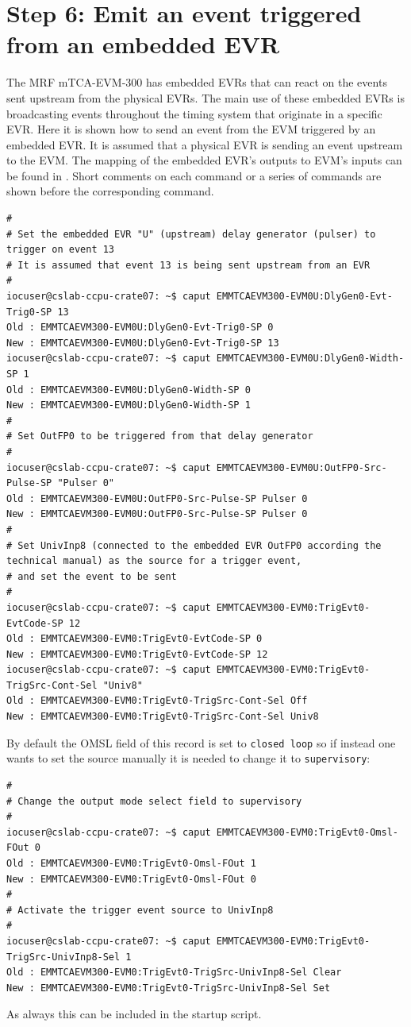 \documentclass[11pt
  , a4paper
  , article
  , oneside
  , showtrims
]{memoir}
\begin{document}
\section{Step 6: Emit an event triggered from an embedded EVR}
The MRF mTCA-EVM-300 has embedded EVRs that can react on the events sent upstream from the physical EVRs. The main use of these embedded EVRs is broadcasting events throughout the timing system that originate in a specific EVR. Here it is shown how to send an event from the EVM triggered by an embedded EVR. It is assumed that a physical EVR is sending an event upstream to the EVM. The mapping of the embedded EVR's outputs to EVM's inputs can be found in \cite{MRFEVENTGENERATOR}. Short comments on each command or a series of commands are shown before the corresponding command.
\begin{lstlisting}[style=termstyle]
#
# Set the embedded EVR "U" (upstream) delay generator (pulser) to trigger on event 13
# It is assumed that event 13 is being sent upstream from an EVR
#
iocuser@cslab-ccpu-crate07: ~$ caput EMMTCAEVM300-EVM0U:DlyGen0-Evt-Trig0-SP 13
Old : EMMTCAEVM300-EVM0U:DlyGen0-Evt-Trig0-SP 0
New : EMMTCAEVM300-EVM0U:DlyGen0-Evt-Trig0-SP 13
iocuser@cslab-ccpu-crate07: ~$ caput EMMTCAEVM300-EVM0U:DlyGen0-Width-SP 1
Old : EMMTCAEVM300-EVM0U:DlyGen0-Width-SP 0
New : EMMTCAEVM300-EVM0U:DlyGen0-Width-SP 1
#
# Set OutFP0 to be triggered from that delay generator
#
iocuser@cslab-ccpu-crate07: ~$ caput EMMTCAEVM300-EVM0U:OutFP0-Src-Pulse-SP "Pulser 0"
Old : EMMTCAEVM300-EVM0U:OutFP0-Src-Pulse-SP Pulser 0
New : EMMTCAEVM300-EVM0U:OutFP0-Src-Pulse-SP Pulser 0
#
# Set UnivInp8 (connected to the embedded EVR OutFP0 according the technical manual) as the source for a trigger event,
# and set the event to be sent
#
iocuser@cslab-ccpu-crate07: ~$ caput EMMTCAEVM300-EVM0:TrigEvt0-EvtCode-SP 12
Old : EMMTCAEVM300-EVM0:TrigEvt0-EvtCode-SP 0
New : EMMTCAEVM300-EVM0:TrigEvt0-EvtCode-SP 12
iocuser@cslab-ccpu-crate07: ~$ caput EMMTCAEVM300-EVM0:TrigEvt0-TrigSrc-Cont-Sel "Univ8"
Old : EMMTCAEVM300-EVM0:TrigEvt0-TrigSrc-Cont-Sel Off
New : EMMTCAEVM300-EVM0:TrigEvt0-TrigSrc-Cont-Sel Univ8
\end{lstlisting}

By default the OMSL field of this record is set to \texttt{closed loop} so if instead one wants to set the source manually it is needed to change it to \texttt{supervisory}:
\begin{lstlisting}[style=termstyle]
#
# Change the output mode select field to supervisory
#
iocuser@cslab-ccpu-crate07: ~$ caput EMMTCAEVM300-EVM0:TrigEvt0-Omsl-FOut 0
Old : EMMTCAEVM300-EVM0:TrigEvt0-Omsl-FOut 1
New : EMMTCAEVM300-EVM0:TrigEvt0-Omsl-FOut 0
#
# Activate the trigger event source to UnivInp8
#
iocuser@cslab-ccpu-crate07: ~$ caput EMMTCAEVM300-EVM0:TrigEvt0-TrigSrc-UnivInp8-Sel 1
Old : EMMTCAEVM300-EVM0:TrigEvt0-TrigSrc-UnivInp8-Sel Clear
New : EMMTCAEVM300-EVM0:TrigEvt0-TrigSrc-UnivInp8-Sel Set
\end{lstlisting}
As always this can be included in the startup script.\\
\end{document}
